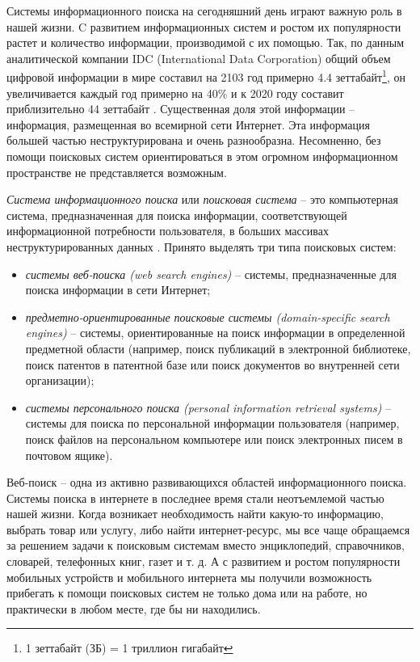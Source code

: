 \documentclass[12pt,a4paper]{report}
\begin{document}

Системы информационного поиска на сегодняшний день играют важную роль в нашей жизни. C развитием информационных систем и ростом их популярности растет и количество информации, производимой с их помощью. Так, по данным аналитической компании IDC (International Data Corporation) общий объем цифровой информации в мире составил на 2103 год примерно 4.4 зеттабайт\footnote{1 зеттабайт (ЗБ) = 1 триллион гигабайт}, он увеличивается каждый год примерно на 40\% и к 2020 году составит приблизительно 44 зеттабайт \cite{IDC-Analytics}. Существенная доля этой информации -- информация, размещенная во всемирной сети Интернет. Эта информация большей частью неструктурирована и очень разнообразна. Несомненно, без помощи поисковых систем ориентироваться в этом огромном информационном пространстве не представляется возможным.

\emph{Система информационного поиска} или \emph{поисковая система}  -- это компьютерная система, предназначенная для поиска информации, соответствующей информационной потребности пользователя, в больших массивах неструктурированных данных \cite{Manning-IR}. Принято выделять три типа поисковых систем:
\begin{itemize}
\item \emph{системы веб-поиска (web search engines)} -- системы, предназначенные для поиска информации в сети Интернет;
\item \emph{предметно-ориентированные поисковые системы (domain-specific search engines)} -- системы, ориентированные на поиск информации в определенной предметной области (например, поиск публикаций в электронной библиотеке, поиск патентов в патентной базе или поиск документов во внутренней сети организации);
\item \emph{системы персонального поиска (personal information retrieval systems)} -- системы для поиска по персональной информации пользователя (например, поиск файлов на персональном компьютере или поиск электронных писем в почтовом ящике).
\end{itemize}

Веб-поиск -- одна из активно развивающихся областей информационного поиска. Системы поиска в интернете в последнее время стали неотъемлемой частью нашей жизни. Когда возникает необходимость найти какую-то информацию, выбрать товар или услугу, либо найти интернет-ресурс, мы все чаще обращаемся за решением задачи к поисковым системам вместо энциклопедий, справочников, словарей, телефонных книг, газет и т. д. А с развитием и ростом популярности мобильных устройств и мобильного интернета мы получили возможность прибегать к помощи поисковых систем не только дома или на работе, но практически в любом месте, где бы ни находились.
\end{document}
